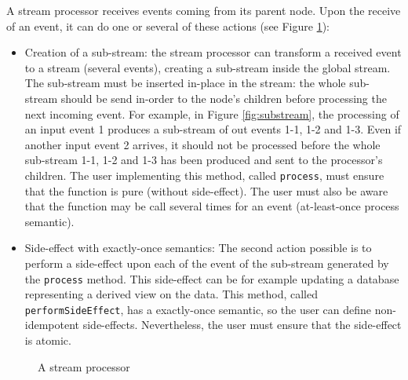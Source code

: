 A stream processor receives events coming from its parent node. Upon the receive of an event, it can do one or several of these
actions (see Figure \ref{fig:streamprocessor}):
\begin{itemize}
  \item Creation of a sub-stream: the stream processor can transform a received event to a stream (several events), creating a sub-stream
  inside the global stream. The sub-stream must be inserted in-place in the stream: the whole sub-stream should be
  send in-order to the node's children before processing the next incoming event. For example, in Figure \ref{fig:substream},
  the processing of an input event 1 produces a sub-stream of out events 1-1, 1-2 and 1-3. Even if another input event 2
  arrives, it should not be processed before the whole sub-stream 1-1, 1-2 and 1-3 has been produced and sent to the processor's 
  children.
  The user implementing this method, called \verb|process|, must ensure that the function is pure (without side-effect).
  The user must also be aware that the function may be call several times for an event (at-least-once process semantic).
  \item Side-effect with exactly-once semantics: The second action possible is to perform a side-effect upon each of the event
  of the sub-stream generated by the \verb|process| method. This side-effect can be for example updating a database representing
  a derived view on the data. This method, called \verb|performSideEffect|, has a exactly-once semantic, so the user
  can define non-idempotent side-effects. Nevertheless, the user must ensure that the side-effect is atomic. 
\end{itemize}

\begin{figure}[h]
  \begin{center} 
    \caption{A stream processor}
    \label{fig:streamprocessor}
  \end{center}
\end{figure}

